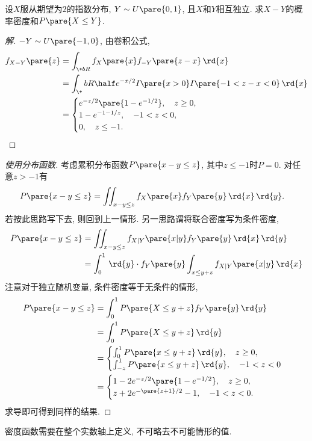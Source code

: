 \documentclass{ctexart}
\begin{document}
\begin{sample}
    \begin{ex}
        设$X$服从期望为$2$的指数分布, $Y\sim U\pare{0,1}$, 且$X$和$Y$相互独立. 求$X-Y$的概率密度和$P\pare{X\le Y}$.
    \end{ex}
    \begin{proof}[解]
        $-Y\sim U\pare{-1,0}$, 由卷积公式,
        \begin{align*}
            f_{X-Y}\pare{z} &= \int_{\+bR} f_X\pare{x} f_{-Y}\pare{z-x}\,\rd{x}\\
            & = \int_\+bR \half e^{-x/2}I\pare{x>0}I\pare{-1<z-x<0}\,\rd{x}\\
            &= \begin{cases}
                e^{-z/2}\pare{1-e^{-1/2}},\quad z\ge 0,\\
                1-e^{-1-1/z},\quad -1<z<0,\\
                0,\quad z\le -1.
            \end{cases}
            \qedhere
        \end{align*}
    \end{proof}
    \begin{proof}[使用分布函数]
        考虑累积分布函数$P\pare{x-y\le z}$, 其中$z\le -1$时$P = 0$. 对任意$z > -1$有
        \begin{align*}
            P\pare{x-y\le z} &= \iint_{x-y\le z} f_X\pare{x} f_Y\pare{y}\,\rd{x}\,\rd{y}.
        \end{align*}
        若按此思路写下去, 则回到上一情形. 另一思路谓将联合密度写为条件密度, 
        \begin{align*}
            P\pare{x-y\le z} &= \iint_{x-y\le z} f_{X\vert Y}\pare{x\vert y} f_Y\pare{y}\,\rd{x}\,\rd{y} \\
            &= \int_{0}^1 \,\rd{y}\cdot f_Y\pare{y} \int_{x\le y+z} f_{X\vert Y}\pare{x\vert y}\,\rd{x}
        \end{align*}
        注意对于独立随机变量, 条件密度等于无条件的情形,
        \begin{align*}
            P\pare{x-y\le z} &= \int_0^1 P\pare{X\le y+z}f_Y\pare{y}\,\rd{y} \\
            &= \int_0^1 P\pare{X\le y+z}\,\rd{y} \\
            &= \begin{cases}
                \int_0^1 P\pare{x\le y+z}\,\rd{y},\quad z\ge 0,\\
                \int_{-z}^1 P\pare{x\le y+z}\,\rd{y},\quad -1 < z < 0
            \end{cases}\\
            &= \begin{cases}
                1 - 2e^{-z/2}\pare{1-e^{-1/2}},\quad z\ge 0,\\
                z + 2e^{-\pare{z+1}/2} -1,\quad -1<z<0.
            \end{cases}
        \end{align*}
        求导即可得到同样的结果.
    \end{proof}
\end{sample}
\begin{remark}
    密度函数需要在整个实数轴上定义, 不可略去不可能情形的值.
\end{remark}
\end{document}
